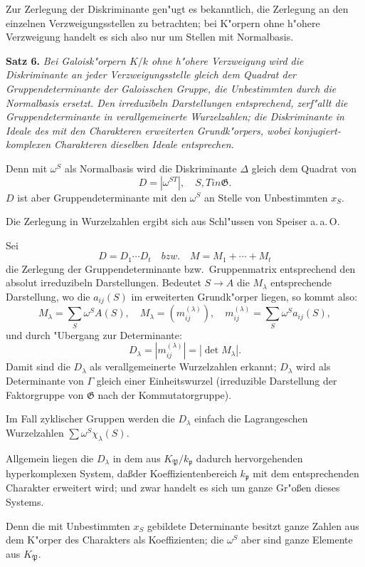 \documentclass[12pt,a4paper]{article}
\theoremstyle{plain}
\begin{document}
\smallskip

Zur Zerlegung der Diskriminante gen"ugt es bekanntlich, die Zerlegung an den einzelnen Verzweigungsstellen zu betrachten; bei K"orpern ohne h"ohere Verzweigung handelt es sich also nur um Stellen mit Normalbasis.

\medskip\noindent\textbf{Satz 6.}
\textit{Bei Galoisk"orpern $K/k$ ohne h"ohere Verzweigung wird die Diskriminante an jeder Verzweigungsstelle gleich dem Quadrat der Gruppendeterminante der Galoisschen Gruppe, die Unbestimmten durch die Normalbasis ersetzt. Den irreduzibeln Darstellungen entsprechend, zerf"allt die Gruppendeterminante in verallgemeinerte Wurzelzahlen; die Diskriminante in Ideale des mit den Charakteren erweiterten Grundk"orpers, wobei konjugiert-komplexen Charakteren dieselben Ideale entsprechen.}

Denn mit $\omega^S$ als Normalbasis wird die Diskriminante $\Delta$ gleich dem Quadrat von
\[
D = |\omega^{ST}|,\quad S,T { in } \mathfrak{G}.
\]
$D$ ist aber Gruppendeterminante mit den $\omega^S$ an Stelle von Unbestimmten $x_S$.

Die Zerlegung in Wurzelzahlen ergibt sich aus Schl"ussen von Speiser a.\,a.\,O.

Sei
\[
D = D_1 \cdots D_t\quad{bzw.}\quad M = M_1 + \cdots + M_t
\]
die Zerlegung der Gruppendeterminante bzw.\ Gruppenmatrix entsprechend den absolut irreduzibeln Darstellungen. Bedeutet $S \to A$ die $M_\lambda$ entsprechende Darstellung, wo die $a_{ij}(S)$ im erweiterten Grundk"orper liegen, so kommt also:
\[
M_\lambda = \sum_S \omega^S A(S),\quad
M_\lambda = (m_{ij}^{(\lambda)}),\quad
m_{ij}^{(\lambda)} = \sum_S \omega^S a_{ij}(S),
\]
und durch "Ubergang zur Determinante:
\[
D_\lambda = |m_{ij}^{(\lambda)}| = |\det M_\lambda|.
\]
Damit sind die $D_\lambda$ als verallgemeinerte Wurzelzahlen erkannt; $D_\lambda$ wird als Determinante von $\Gamma$ gleich einer Einheitswurzel (irreduzible Darstellung der Faktorgruppe von $\mathfrak{G}$ nach der Kommutatorgruppe).

Im Fall zyklischer Gruppen werden die $D_\lambda$ einfach die Lagrangeschen Wurzelzahlen $\sum \omega^S \chi_\lambda(S)$.

Allgemein liegen die $D_\lambda$ in dem aus $K_\mathfrak{P}/k_\mathfrak{p}$ dadurch hervorgehenden hyperkomplexen System, da\ss der Koeffizientenbereich $k_\mathfrak{p}$ mit dem entsprechenden Charakter erweitert wird; und zwar handelt es sich um ganze Gr"o\ss en dieses Systems.

Denn die mit Unbestimmten $x_S$ gebildete Determinante besitzt ganze Zahlen aus dem K"orper des Charakters als Koeffizienten; die $\omega^S$ aber sind ganze Elemente aus $K_\mathfrak{P}$.
\end{document}
